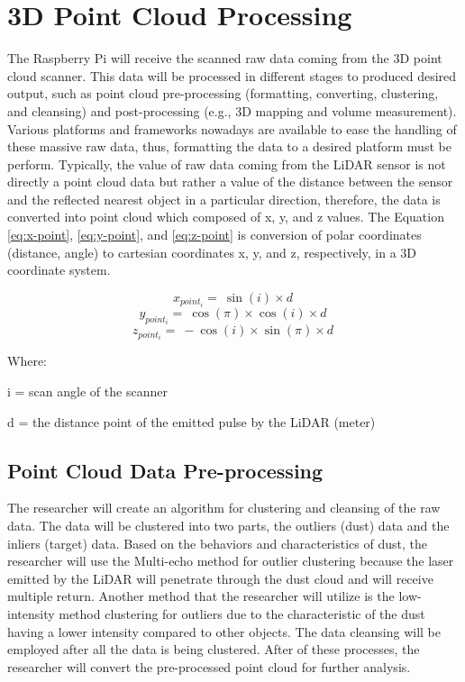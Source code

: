 \section{3D Point Cloud Processing}
\label{method:sec:3D Point Cloud Processing}
The Raspberry Pi will receive the scanned raw data coming from the 3D point cloud scanner. This data will be processed in different stages to produced desired output, such as point cloud pre-processing (formatting, converting, clustering, and cleansing) and post-processing (e.g., 3D mapping and volume measurement). Various platforms and frameworks nowadays are available to ease the handling of these massive raw data, thus, formatting the data to a desired platform must be perform. Typically, the value of raw data coming from the LiDAR sensor is not directly a point cloud data but rather a value of the distance between the sensor and the reflected nearest object in a particular direction, therefore, the data is converted into point cloud which composed of x, y, and z values. The Equation \eqref{eq:x-point}, \eqref{eq:y-point}, and \eqref{eq:z-point} is conversion of polar coordinates (distance, angle) to cartesian coordinates x, y, and z, respectively, in a 3D coordinate system.

\begin{equation}
    x_{point_{i}} = \ \sin(i) \times d \
    \label{eq:x-point}
\end{equation}
\begin{equation}
    y_{point_{i}} = \ \cos(\pi) \times \cos(i) \times d \
    \label{eq:y-point}
\end{equation}
\begin{equation}
    z_{point_{i}} = \ -\cos(i) \times \sin(\pi) \times d \
    \label{eq:z-point}
\end{equation}

Where:

\indent \indent i = scan angle of the scanner

\indent \indent d = the distance point of the emitted pulse by the LiDAR (meter)

\subsection{Point Cloud Data Pre-processing}
The researcher will create an algorithm for clustering and cleansing of the raw data. The data will be clustered into two parts, the outliers (dust) data and the inliers (target) data. Based on the behaviors and characteristics of dust, the researcher will use the Multi-echo method for outlier clustering because the laser emitted by the LiDAR will penetrate through the dust cloud and will receive multiple return. Another method that the researcher will utilize is the low-intensity method clustering for outliers due to the characteristic of the dust having a lower intensity compared to other objects. The data cleansing will be employed after all the data is being clustered. After of these processes, the researcher will convert the pre-processed point cloud for further analysis.

